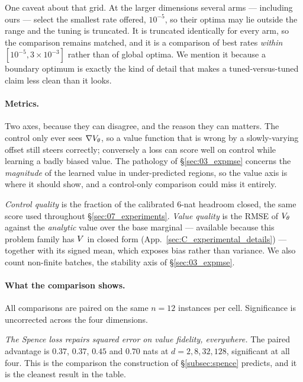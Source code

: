 One caveat about that grid. At the larger dimensions several arms --- including
ours --- select the smallest rate offered, $10^{-5}$, so their optima may lie
outside the range and the tuning is truncated. It is truncated identically for
every arm, so the comparison remains matched, and it is a comparison of best
rates \emph{within} $[10^{-5},3\times10^{-3}]$ rather than of global optima. We
mention it because a boundary optimum is exactly the kind of detail that makes
a tuned-versus-tuned claim less clean than it looks.

\paragraph{Metrics.}
Two axes, because they can disagree, and the reason they can matters. The
control only ever sees $\nabla V_\theta$, so a value function that is wrong
by a slowly-varying offset still steers correctly; conversely a loss can score
well on control while learning a badly biased value. The pathology of
\S\ref{sec:03_expmse} concerns the \emph{magnitude} of the learned value in
under-predicted regions, so the value axis is where it should show, and a
control-only comparison could miss it entirely.

\emph{Control quality} is the fraction of the calibrated $6$-nat headroom
closed, the same score used throughout \S\ref{sec:07_experiments}. \emph{Value quality} is the RMSE of $V_\theta$
against the \emph{analytic} value over the base marginal --- available because
this problem family has $V$ in closed form (App.~\ref{sec:C_experimental_details}) ---
together with its signed mean, which exposes bias rather than variance. We also
count non-finite batches, the stability axis of \S\ref{sec:03_expmse}.



\paragraph{What the comparison shows.}
All comparisons are paired on the same $n=12$ instances per cell. Significance
is uncorrected across the four dimensions.

\emph{The Spence loss repairs squared error on value fidelity, everywhere.}
The paired advantage is $0.37$, $0.37$, $0.45$ and $0.70$ nats at
$d=2,8,32,128$, significant at all four. This is the comparison the
construction of \S\ref{subsec:spence} predicts, and it is the cleanest result
in the table.

